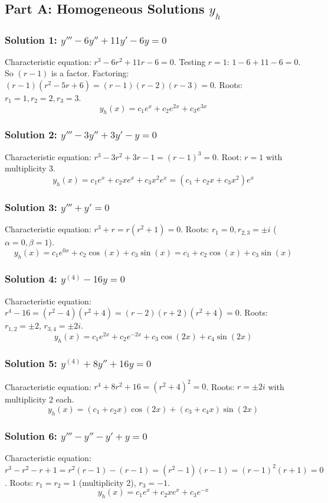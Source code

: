 \documentclass[11pt,letterpaper]{article}
\begin{document}
\subsection*{Part A: Homogeneous Solutions $y_h$}

\subsubsection*{Solution 1: $y''' - 6y'' + 11y' - 6y = 0$}
Characteristic equation: $r^3 - 6r^2 + 11r - 6 = 0$.
Testing $r = 1$: $1 - 6 + 11 - 6 = 0$. So $(r-1)$ is a factor.
Factoring: $(r-1)(r^2 - 5r + 6) = (r-1)(r-2)(r-3) = 0$.
Roots: $r_1 = 1, r_2 = 2, r_3 = 3$.
\[ y_h(x) = c_1 e^x + c_2 e^{2x} + c_3 e^{3x} \]

\subsubsection*{Solution 2: $y''' - 3y'' + 3y' - y = 0$}
Characteristic equation: $r^3 - 3r^2 + 3r - 1 = (r-1)^3 = 0$.
Root: $r = 1$ with multiplicity 3.
\[ y_h(x) = c_1 e^x + c_2 x e^x + c_3 x^2 e^x = (c_1 + c_2 x + c_3 x^2) e^x \]

\subsubsection*{Solution 3: $y''' + y' = 0$}
Characteristic equation: $r^3 + r = r(r^2 + 1) = 0$.
Roots: $r_1 = 0, r_{2,3} = \pm i$ ($\alpha = 0, \beta = 1$).
\[ y_h(x) = c_1 e^{0x} + c_2 \cos(x) + c_3 \sin(x) = c_1 + c_2 \cos(x) + c_3 \sin(x) \]

\subsubsection*{Solution 4: $y^{(4)} - 16y = 0$}
Characteristic equation: $r^4 - 16 = (r^2 - 4)(r^2 + 4) = (r-2)(r+2)(r^2 + 4) = 0$.
Roots: $r_{1,2} = \pm 2$, $r_{3,4} = \pm 2i$.
\[ y_h(x) = c_1 e^{2x} + c_2 e^{-2x} + c_3 \cos(2x) + c_4 \sin(2x) \]

\subsubsection*{Solution 5: $y^{(4)} + 8y'' + 16y = 0$}
Characteristic equation: $r^4 + 8r^2 + 16 = (r^2 + 4)^2 = 0$.
Roots: $r = \pm 2i$ with multiplicity 2 each.
\[ y_h(x) = (c_1 + c_2 x) \cos(2x) + (c_3 + c_4 x) \sin(2x) \]

\subsubsection*{Solution 6: $y''' - y'' - y' + y = 0$}
Characteristic equation: $r^3 - r^2 - r + 1 = r^2(r-1) - (r-1) = (r^2 - 1)(r-1) = (r-1)^2(r+1) = 0$.
Roots: $r_1 = r_2 = 1$ (multiplicity 2), $r_3 = -1$.
\[ y_h(x) = c_1 e^x + c_2 x e^x + c_3 e^{-x} \]
\end{document}
